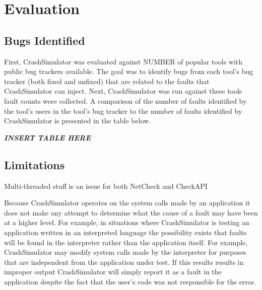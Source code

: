 \section{Evaluation}

    \subsection{Bugs Identified}

    First, CrashSimulator was evaluated against NUMBER of popular tools with public bug trackers available. The goal was
    to identify bugs from each tool's bug tracker (both fixed and unfixed) that are related to the faults that
    CrashSimulator can inject. Next, CrashSimulator was run against these tools fault counts were collected. A
    comparison of the number of faults identified by the tool's users in the tool's bug tracker to the number of faults
    identified by CrashSimulator is presented in the table below.

    \emph{\textbf{INSERT TABLE HERE}}

    \subsection{Limitations}

        Multi-threaded stuff is an issue for both NetCheck and CheckAPI

        Because CrashSimulator operates on the system calls made by an application it does not make any attempt to
        determine what the cause of a fault may have been at a higher level. For example, in situations where
        CrashSimulator is testing an application written in an interpreted language the possibility exists that faults
        will be found in the interpreter rather than the application itself. For example, CrashSimulator may modify
        system calls made by the interpreter for purposes that are independent from the application under test.  If this
        results results in improper output CrashSimulator will simply report it as a fault in the application despite
        the fact that the user's code was not responsible for the error.
